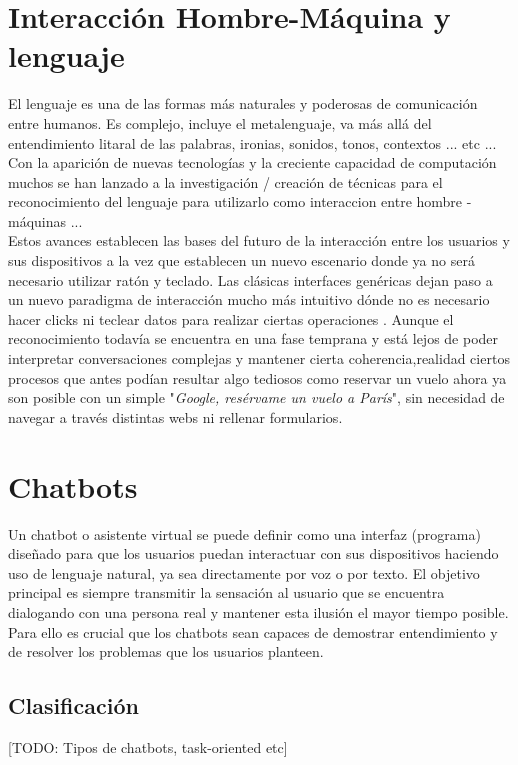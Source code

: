 \section{Interacción Hombre-Máquina y lenguaje}
El lenguaje es una de las formas más naturales y poderosas de comunicación entre humanos. Es complejo, incluye el metalenguaje, va más allá del entendimiento litaral de las palabras, ironias, sonidos, tonos, contextos ... etc ... \\

Con la aparición de nuevas tecnologías y la creciente capacidad de computación muchos se  han lanzado a la investigación / creación de técnicas para el reconocimiento del lenguaje para utilizarlo como interaccion entre hombre -máquinas ...\\

Estos avances establecen las bases del futuro de la interacción entre los usuarios y sus dispositivos a la vez que establecen un nuevo escenario donde ya no será necesario utilizar ratón y teclado. Las clásicas interfaces genéricas dejan paso a un nuevo paradigma de interacción mucho más intuitivo dónde no es necesario hacer clicks ni teclear datos para realizar ciertas operaciones \cite{conversationSystems}. Aunque el reconocimiento todavía se encuentra en una fase temprana y está lejos de poder interpretar conversaciones complejas y mantener cierta coherencia,realidad ciertos procesos que antes podían resultar algo tediosos como reservar un vuelo ahora ya son posible con un simple "\textit{Google, resérvame un vuelo a París}", sin necesidad de navegar a través distintas webs ni rellenar formularios.\\

\section{Chatbots}
Un chatbot o asistente virtual se puede definir como una interfaz (programa) diseñado para que los usuarios puedan interactuar con sus dispositivos haciendo uso de lenguaje natural, ya sea directamente por voz o por texto. El objetivo principal es siempre transmitir la sensación al usuario que se encuentra dialogando con una persona real y mantener esta ilusión el mayor tiempo posible. Para ello es crucial que los chatbots sean capaces de demostrar entendimiento y de resolver los problemas que los usuarios planteen.\\

\subsection{Clasificación}
[TODO: Tipos de chatbots, task-oriented etc]

